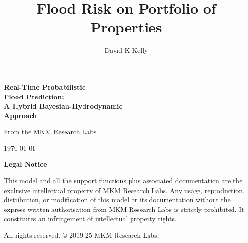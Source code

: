 \documentclass{article}
\title{Flood Risk on Portfolio of Properties}
\author{David K Kelly}
\date{}
\begin{document}
\begin{titlepage}
\begin{center}

\vspace*{2cm}

\begin{figure}\centering
{}
\end{figure}

\vspace{2cm}

{\Huge\bfseries Real-Time Probabilistic\\Flood Prediction:\\ A Hybrid Bayesian-Hydrodynamic\\Approach\par}

\vspace{2cm}

{\Large From the MKM Research Labs\par}

\vspace{1cm}

{\large \today\par}

\end{center}
\end{titlepage}
\clearpage

\tableofcontents

\newpage
\begin{center}
\large\textbf{Legal Notice}

\vspace{2em}

\noindent This model and all the support functions plus associated documentation are the exclusive intellectual property of MKM Research Labs. Any usage, reproduction, distribution, or modification of this model or its documentation without the express written authorisation from MKM Research Labs is strictly prohibited. It constitutes an infringement of intellectual property rights.

\vspace{1em}

\noindent All rights reserved. © 2019-25 MKM Research Labs.

\vspace{2em}
\end{center}
\clearpage
\end{document}
